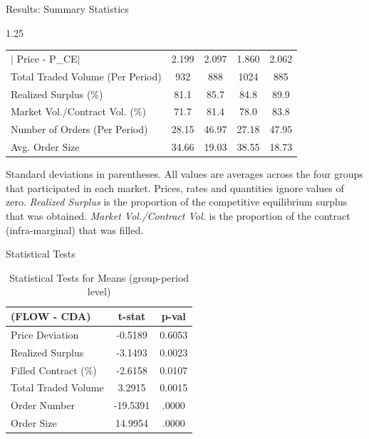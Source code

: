 \documentclass[10pt]{beamer}
\begin{document}
\begin{frame}{Results: Summary Statistics}
\begin{table}[H]
{\begin{threeparttable}
\begin{spacing}{1.25}
\begin{tabular}{lcccc}
                 $\mid$ Price - P_{CE}$\mid$      & 2.199                 & 2.097                & 1.860                 & 2.062    \\
                 Total Traded Volume (Per Period) & 932                   & 888                  & 1024                  & 885      \\
                 Realized Surplus (\%)            & 81.1                  & 85.7                 & 84.8                  & 89.9     \\
                 Market Vol./Contract Vol. (\%)   & 71.7                  & 81.4                 & 78.0                  & 83.8     \\
                 Number of Orders (Per Period)   & 28.15                 & 46.97                & 27.18                 & 47.95    \\
                 Avg. Order Size                  & 34.66                 & 19.03                & 38.55                 & 18.73    \\
                \hline
                \hline
            \end{tabular}
            \end{spacing}
            \begin{tablenotes}\noindent\justifying\scriptsize Standard deviations in parentheses. All values are averages across the four groups that participated in each market. Prices, rates and quantities ignore values of zero. \textit{Realized Surplus} is the proportion of the competitive equilibrium surplus that was obtained. \textit{Market Vol./Contract Vol.} is the proportion of the contract (infra-marginal) that was filled. \end{tablenotes}
        \end{threeparttable}}
    \end{table}
\end{frame}

\begin{frame}{Statistical Tests}
    \begin{table}[H]
        \footnotesize
        \centering
        \begin{tabular}{lcc}
            \hline 
            \hline
            (FLOW - CDA) & t-stat & p-val \\
            \hline
            Price Deviation & -0.5189 & 0.6053 \\
            Realized Surplus & -3.1493 & 0.0023 \\
            Filled Contract (\%) & -2.6158 & 0.0107 \\
            Total Traded Volume & 3.2915 & 0.0015 \\
            Order Number & -19.5391 & .0000 \\
            Order Size & 14.9954 & .0000 \\
            \hline
            \hline
        \end{tabular}
        \caption{Statistical Tests for Means (group-period level) }
        \label{tab:stat_tests}
    \end{table}
\end{frame}
\end{document}
